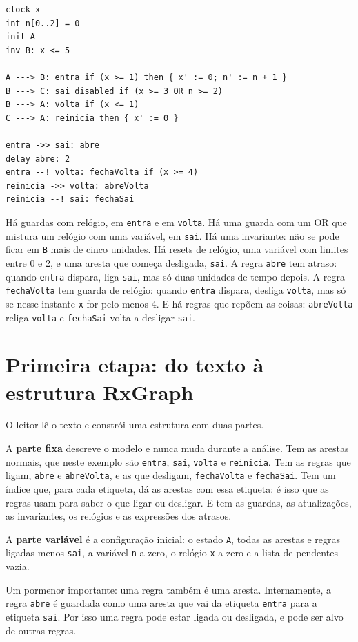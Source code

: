 \documentclass[11pt,a4paper]{article}
\newcommand{\code}[1]{\texttt{#1}}
\begin{document}
\begin{lstlisting}
clock x
int n[0..2] = 0
init A
inv B: x <= 5

A ---> B: entra if (x >= 1) then { x' := 0; n' := n + 1 }
B ---> C: sai disabled if (x >= 3 OR n >= 2)
B ---> A: volta if (x <= 1)
C ---> A: reinicia then { x' := 0 }

entra ->> sai: abre
delay abre: 2
entra --! volta: fechaVolta if (x >= 4)
reinicia ->> volta: abreVolta
reinicia --! sai: fechaSai
\end{lstlisting}

Há guardas com relógio, em \code{entra} e em \code{volta}. Há uma guarda com um OR que mistura um relógio com uma variável, em \code{sai}. Há uma invariante: não se pode ficar em \code{B} mais de cinco unidades. Há resets de relógio, uma variável com limites entre 0 e 2, e uma aresta que começa desligada, \code{sai}. A regra \code{abre} tem atraso: quando \code{entra} dispara, liga \code{sai}, mas só duas unidades de tempo depois. A regra \code{fechaVolta} tem guarda de relógio: quando \code{entra} dispara, desliga \code{volta}, mas só se nesse instante \code{x} for pelo menos 4. E há regras que repõem as coisas: \code{abreVolta} religa \code{volta} e \code{fechaSai} volta a desligar \code{sai}.

\section{Primeira etapa: do texto à estrutura RxGraph}

O leitor lê o texto e constrói uma estrutura com duas partes.

A \textbf{parte fixa} descreve o modelo e nunca muda durante a análise. Tem as arestas normais, que neste exemplo são \code{entra}, \code{sai}, \code{volta} e \code{reinicia}. Tem as regras que ligam, \code{abre} e \code{abreVolta}, e as que desligam, \code{fechaVolta} e \code{fechaSai}. Tem um índice que, para cada etiqueta, dá as arestas com essa etiqueta: é isso que as regras usam para saber o que ligar ou desligar. E tem as guardas, as atualizações, as invariantes, os relógios e as expressões dos atrasos.

A \textbf{parte variável} é a configuração inicial: o estado \code{A}, todas as arestas e regras ligadas menos \code{sai}, a variável \code{n} a zero, o relógio \code{x} a zero e a lista de pendentes vazia.

Um pormenor importante: uma regra também é uma aresta. Internamente, a regra \code{abre} é guardada como uma aresta que vai da etiqueta \code{entra} para a etiqueta \code{sai}. Por isso uma regra pode estar ligada ou desligada, e pode ser alvo de outras regras.
\end{document}
